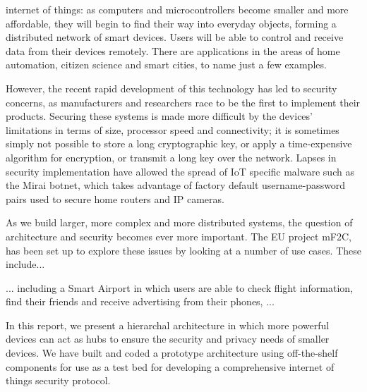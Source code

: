 internet of things: as computers and microcontrollers become smaller and more affordable, they will begin to find their way into everyday objects, forming a distributed network of smart devices. Users will be able to control and receive data from their devices remotely. There are applications in the areas of home automation, citizen science and smart cities, to name just a few examples.

However, the recent rapid development of this technology has led to security concerns, as manufacturers and researchers race to be the first to implement their products. Securing these systems is made more difficult by the devices’ limitations in terms of size, processor speed and connectivity; it is sometimes simply not possible to store a long cryptographic key, or apply a time-expensive algorithm for encryption, or transmit a long key over the network. Lapses in security implementation have allowed the spread of IoT specific malware such as the Mirai botnet, which takes advantage of factory default username-password pairs used to secure home routers and IP cameras.

As we build larger, more complex and more distributed systems, the question of architecture and security becomes ever more important. The EU project mF2C, has been set up to explore these issues by looking at a number of use cases. These include...

...
 including a Smart Airport in which users are able to check flight information, find their friends and receive advertising from their phones, ...
 
In this report, we present a hierarchal architecture in which more powerful devices can act as hubs to ensure the security and privacy needs of smaller devices.  We have built and coded a prototype architecture using off-the-shelf components for use as a test bed for developing a comprehensive internet of things security protocol.